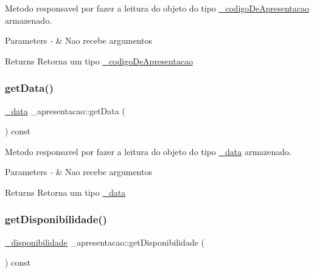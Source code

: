 Metodo responsavel por fazer a leitura do objeto do tipo \mbox{\hyperlink{class__codigo_de_apresentacao}{\+\_\+codigo\+De\+Apresentacao}} armazenado. 


\begin{DoxyParams}{Parameters}
{\em -\/} & Nao recebe argumentos \\
\hline
\end{DoxyParams}
\begin{DoxyReturn}{Returns}
Retorna um tipo \mbox{\hyperlink{class__codigo_de_apresentacao}{\+\_\+codigo\+De\+Apresentacao}} 
\end{DoxyReturn}
\mbox{\label{class__apresentacao_a43f87997a319fab4f88b78846813badf}} 
\subsubsection{\texorpdfstring{getData()}{getData()}}
{\footnotesize\ttfamily \mbox{\hyperlink{class__data}{\+\_\+data}} \+\_\+apresentacao\+::get\+Data (\begin{DoxyParamCaption}{ }\end{DoxyParamCaption}) const}



Metodo responsavel por fazer a leitura do objeto do tipo \mbox{\hyperlink{class__data}{\+\_\+data}} armazenado. 


\begin{DoxyParams}{Parameters}
{\em -\/} & Nao recebe argumentos \\
\hline
\end{DoxyParams}
\begin{DoxyReturn}{Returns}
Retorna um tipo \mbox{\hyperlink{class__data}{\+\_\+data}} 
\end{DoxyReturn}
\mbox{\label{class__apresentacao_a0d7f30c7cec0cb4b41819ff7364f347d}} 
\subsubsection{\texorpdfstring{getDisponibilidade()}{getDisponibilidade()}}
{\footnotesize\ttfamily \mbox{\hyperlink{class__disponibilidade}{\+\_\+disponibilidade}} \+\_\+apresentacao\+::get\+Disponibilidade (\begin{DoxyParamCaption}{ }\end{DoxyParamCaption}) const}



